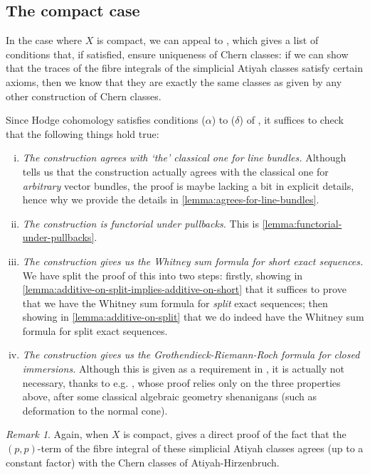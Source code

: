 \documentclass[11pt,fleqn]{article}
\theoremstyle{plain}
\theoremstyle{definition}
\theoremstyle{remark}
\newtheorem{remark}[theorem]{Remark}
\numberwithin{equation}{theorem}
\begin{document}
    \subsection{The compact case}\label{subsection:the-compact-case}

        In the case where $X$ is compact, we can appeal to \cite[Theorem~6.5]{Grivaux2009}, which gives a list of conditions that, if satisfied, ensure uniqueness of Chern classes: if we can show that the traces of the fibre integrals of the simplicial Atiyah classes satisfy certain axioms, then we know that they are exactly the same classes as given by any other construction of Chern classes.

        Since Hodge cohomology satisfies conditions ($\alpha$) to ($\delta$) of \cite[§6.2]{Grivaux2009}, it suffices to check that the following things hold true:
        \begin{enumerate}[(i)]
            \item \emph{The construction agrees with `the' classical one for line bundles.}
                Although \cite[Lemma~2.5]{Green1980} tells us that the construction actually agrees with the classical one for \emph{arbitrary} vector bundles, the proof is maybe lacking a bit in explicit details, hence why we provide the details in \cref{lemma:agrees-for-line-bundles}.
            \item \emph{The construction is functorial under pullbacks.}
                This is \cref{lemma:functorial-under-pullbacks}.
            \item \emph{The construction gives us the Whitney sum formula for short exact sequences.}
                We have split the proof of this into two steps: firstly, showing in \cref{lemma:additive-on-split-implies-additive-on-short} that it suffices to prove that we have the Whitney sum formula for \emph{split} exact sequences; then showing in \cref{lemma:additive-on-split} that we do indeed have the Whitney sum formula for split exact sequences.
            \item \emph{The construction gives us the Grothendieck-Riemann-Roch formula for closed immersions.}
                Although this is given as a requirement in \cite[Theorem~6.5]{Grivaux2009}, it is actually not necessary, thanks to e.g. \cite[Proposition~3.1]{Grivaux2012}, whose proof relies only on the three properties above, after some classical algebraic geometry shenanigans (such as deformation to the normal cone).
        \end{enumerate}

        \begin{remark}
            Again, when $X$ is compact, \cite[Lemma~2.7]{Green1980} gives a direct proof of the fact that the $(p,p)$-term of the fibre integral of these simplicial Atiyah classes agrees (up to a constant factor) with the Chern classes of Atiyah-Hirzenbruch.
        \end{remark}



\printbibliography
\end{document}
